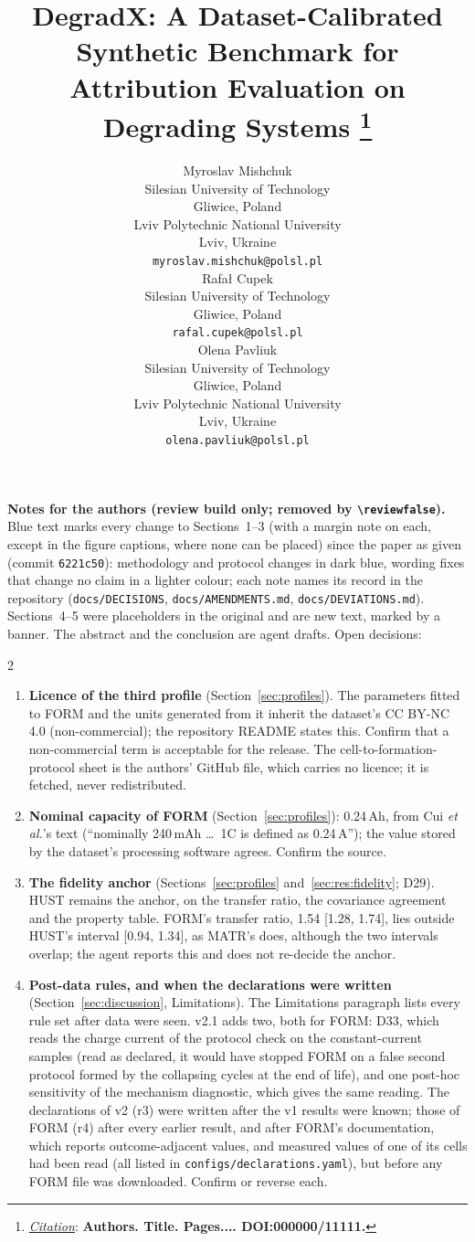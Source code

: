 \documentclass{article}
\title{DegradX: A Dataset-Calibrated Synthetic Benchmark for Attribution Evaluation on Degrading Systems
\thanks{\textit{\underline{Citation}}: 
\textbf{Authors. Title. Pages.... DOI:000000/11111.}} 
}
\author{
  Myroslav Mishchuk \\
  Silesian University of Technology \\ 
  Gliwice, Poland \\
  Lviv Polytechnic National University \\ 
  Lviv, Ukraine \\
  \texttt{myroslav.mishchuk@polsl.pl} \\
   \And
  Rafał Cupek \\
  Silesian University of Technology \\ 
  Gliwice, Poland\\
  \texttt{rafal.cupek@polsl.pl} \\
    \And
  Olena Pavliuk \\
  Silesian University of Technology \\ 
  Gliwice, Poland \\
  Lviv Polytechnic National University \\ 
  Lviv, Ukraine \\
  \texttt{olena.pavliuk@polsl.pl} \\
}
\newif\ifreview \reviewtrue        %
\newcommand{\rev}[1]{\ifreview\textcolor[HTML]{0B5FA5}{#1}\else#1\fi}
\newcommand{\revw}[1]{\ifreview\textcolor[HTML]{6FA8A0}{#1}\else#1\fi}   %
\begin{document}
\maketitle

\begin{revnotes}
\textbf{Notes for the authors (review build only; removed by \texttt{\textbackslash reviewfalse}).} Blue text marks every change to Sections~1--3 (with a margin note on each, except in the figure captions, where none can be placed) since the paper as given (commit \texttt{6221c50}): \rev{methodology and protocol changes} in dark blue, \revw{wording fixes that change no claim} in a lighter colour; each note names its record in the repository (\texttt{docs/DECISIONS}, \texttt{docs/AMENDMENTS.md}, \texttt{docs/DEVIATIONS.md}). Sections~4--5 were placeholders in the original and are new text, marked by a banner. The abstract and the conclusion are agent drafts. Open decisions:
\begin{multicols}{2}\setlength{\leftmargini}{1.4em}\begin{enumerate}\itemsep0pt
\item \textbf{Licence of the third profile} (Section~\ref{sec:profiles}). The parameters fitted to FORM and the units generated from it inherit the dataset's CC BY-NC 4.0 (non-commercial); the repository README states this. Confirm that a non-commercial term is acceptable for the release. The cell-to-formation-protocol sheet is the authors' GitHub file, which carries no licence; it is fetched, never redistributed.
\item \textbf{Nominal capacity of FORM} (Section~\ref{sec:profiles}): 0.24\,Ah, from Cui \emph{et al.}'s text (``nominally 240\,mAh \dots\ 1C is defined as 0.24\,A''); the value stored by the dataset's processing software agrees. Confirm the source.
\item \textbf{The fidelity anchor} (Sections~\ref{sec:profiles} and~\ref{sec:res:fidelity}; D29). HUST remains the anchor, on the transfer ratio, the covariance agreement and the property table. FORM's transfer ratio, 1.54 [1.28, 1.74], lies outside HUST's interval [0.94, 1.34], as MATR's does, although the two intervals overlap; the agent reports this and does not re-decide the anchor.
\item \textbf{Post-data rules, and when the declarations were written} (Section~\ref{sec:discussion}, Limitations). The Limitations paragraph lists every rule set after data were seen. v2.1 adds two, both for FORM: D33, which reads the charge current of the protocol check on the constant-current samples (read as declared, it would have stopped FORM on a false second protocol formed by the collapsing cycles at the end of life), and one post-hoc sensitivity of the mechanism diagnostic, which gives the same reading. The declarations of v2 (r3) were written after the v1 results were known; those of FORM (r4) after every earlier result, and after FORM's documentation, which reports outcome-adjacent values, and measured values of one of its cells had been read (all listed in \texttt{configs/declarations.yaml}), but before any FORM file was downloaded. Confirm or reverse each.

\end{enumerate}
\end{multicols}
\end{revnotes}
\end{document}
